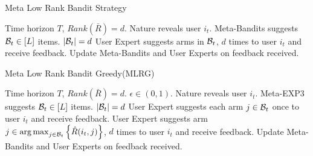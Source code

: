 %
%
%



\begin{algorithm}[!th]
\caption{Meta Low Rank Bandit Strategy}
\label{alg:mLRBS}
\begin{algorithmic}[1]
 Time horizon $T$, $Rank(\bar{R}) = d$.
\State Nature reveals user $i_t$.  
\State Meta-Bandits suggests $\mathcal{B}_t\in[L]$ items. $|\mathcal{B}_t| = d$
\State User Expert suggests arms in $\mathcal{B}_t$, $d$ times to user $i_t$ and receive feedback.
\State Update Meta-Bandits and User Experts on feedback received.
\EndFor
\end{algorithmic}
\end{algorithm}

\begin{algorithm}[!th]
\caption{Meta Low Rank Bandit Greedy(MLRG)}
\label{alg:mLRBS1}
\begin{algorithmic}[1]
 Time horizon $T$, $Rank(\bar{R}) = d$.
 $\epsilon\in (0,1)$.
\State Nature reveals user $i_t$.  
\State Meta-EXP3 suggests $\mathcal{B}_t\in[L]$ items. $|\mathcal{B}_t| = d$
	 
\State User Expert suggests each arm $j\in\mathcal{B}_t$ once to user $i_t$ and receive feedback.
\EndFor
{} 
\State User Expert suggests arm $j\in \mathop{\rm arg\,max}_{j\in\mathcal{B}_t}\left\lbrace \hat{R}(i_t,j)\right\rbrace$, $d$ times to user $i_t$ and receive feedback.
\EndFor
\State Update Meta-Bandits and User Experts on feedback received.
\EndFor
\end{algorithmic}
\end{algorithm}


